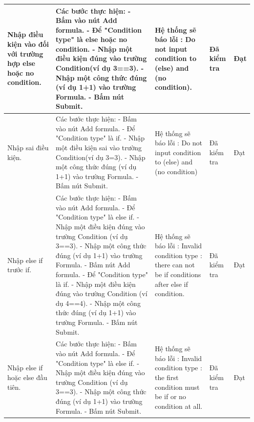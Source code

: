 \documentclass[a4paper]{article}
\begin{document}
\begin{longtable}{ | p{} |p{} | p{}  | p{}  | p{}  | }
\hline
Nhập điều kiện vào đối với trường hợp else hoặc no condition. &
Các bước thực hiện: \newline
- Bấm vào nút Add formula. \newline
- Để "Condition type" là else hoặc no condition. \newline
- Nhập một điều kiện đúng vào trường Condition(ví dụ 3==3). \newline
- Nhập một công thức đúng (ví dụ 1+1) vào trường Formula. \newline
- Bấm nút Submit.  
&
Hệ thống sẽ báo lỗi : Do not input condition to (else) and (no condition).
&
Đã kiểm tra &
Đạt \\

\hline
Nhập sai điều kiện. &
Các bước thực hiện: \newline
- Bấm vào nút Add formula. \newline
- Để "Condition type" là if. \newline
- Nhập một điều kiện sai vào trường Condition(ví dụ 3=3). \newline
- Nhập một công thức đúng (ví dụ 1+1) vào trường Formula. \newline
- Bấm nút Submit.  
&
Hệ thống sẽ báo lỗi : Do not input condition to (else) and (no condition)
&
Đã kiểm tra &
Đạt \\

\hline
Nhập else if trước if. &
Các bước thực hiện: \newline
- Bấm vào nút Add formula. \newline
- Để "Condition type" là else if. \newline
- Nhập một điều kiện đúng vào trường Condition (ví dụ 3==3). \newline
- Nhập một công thức đúng (ví dụ 1+1) vào trường Formula. \newline
- Bấm nút Add formula. \newline
- Để "Condition type" là if. \newline
- Nhập một điều kiện đúng vào trường Condition (ví dụ 4==4). \newline
- Nhập một công thức đúng (ví dụ 1+1) vào trường Formula. \newline
- Bấm nút Submit.  
&
Hệ thống sẽ báo lỗi : Invalid condition type : there can not be if conditions after else if condition.
&
Đã kiểm tra &
Đạt \\

\hline
Nhập else if hoặc else đầu tiên. &
Các bước thực hiện: \newline
- Bấm vào nút Add formula. \newline
- Để "Condition type" là else if. \newline
- Nhập một điều kiện đúng vào trường Condition (ví dụ 3==3). \newline
- Nhập một công thức đúng (ví dụ 1+1) vào trường Formula. \newline
- Bấm nút Submit.
&
Hệ thống sẽ báo lỗi : Invalid condition type : the first condition must be if or no condition at all.
&
Đã kiểm tra &
Đạt \\


\end{longtable}
\end{document}

